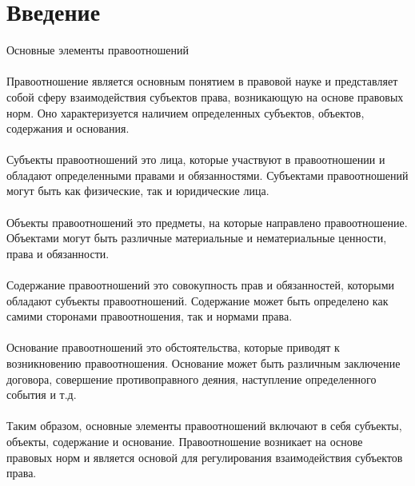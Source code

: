 \documentclass{article}
\begin{document}
\section{Введение}
Основные элементы правоотношений\\
~\\
Правоотношение является основным понятием в правовой науке и представляет собой сферу взаимодействия субъектов права, возникающую на основе правовых норм. Оно характеризуется наличием определенных субъектов, объектов, содержания и основания.\\
~\\
Субъекты правоотношений  это лица, которые участвуют в правоотношении и обладают определенными правами и обязанностями. Субъектами правоотношений могут быть как физические, так и юридические лица.\\
~\\
Объекты правоотношений  это предметы, на которые направлено правоотношение. Объектами могут быть различные материальные и нематериальные ценности, права и обязанности.\\
~\\
Содержание правоотношений  это совокупность прав и обязанностей, которыми обладают субъекты правоотношений. Содержание может быть определено как самими сторонами правоотношения, так и нормами права.\\
~\\
Основание правоотношений  это обстоятельства, которые приводят к возникновению правоотношения. Основание может быть различным  заключение договора, совершение противоправного деяния, наступление определенного события и т.д.\\
~\\
Таким образом, основные элементы правоотношений включают в себя субъекты, объекты, содержание и основание. Правоотношение возникает на основе правовых норм и является основой для регулирования взаимодействия субъектов права.\\
~\\

\newpage
\end{document}
